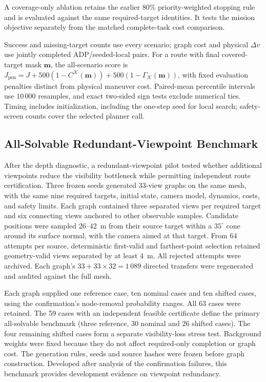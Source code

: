 \documentclass{IEEEtaes}
\newcommand{\unit}[2]{#1~#2}
\begin{document}
A coverage-only ablation retains the earlier 80\% priority-weighted stopping rule and is evaluated against the same required-target identities. It tests the mission objective separately from the matched complete-task cost comparison.

Success and missing-target counts use every scenario; graph cost and physical $\Delta v$ use jointly completed ADP/seeded-local pairs. For a route with final covered-target mask $\mathbf m$, the all-scenario score is $J_{\mathrm{pen}}=J+500(1-C^{\mathcal K}(\mathbf m))+500(1-\Gamma_{\mathcal K}(\mathbf m))$, with fixed evaluation penalties distinct from physical maneuver cost. Paired-mean percentile intervals use $10\,000$ resamples, and exact two-sided sign tests exclude numerical ties. Timing includes initialization, including the one-step seed for local search; safety-screen counts cover the selected planner call.

\subsection{All-Solvable Redundant-Viewpoint Benchmark}
\label{sec:redundant-view-protocol}

After the depth diagnostic, a redundant-viewpoint pilot tested whether additional viewpoints reduce the visibility bottleneck while permitting independent route certification. Three frozen seeds generated 33-view graphs on the same mesh, with the same nine required targets, initial state, camera model, dynamics, costs, and safety limits. Each graph contained three separated views per required target and six connecting views anchored to other observable samples. Candidate positions were sampled \unit{26--42}{m} from their source target within a $35^{\circ}$ cone around its surface normal, with the camera aimed at that target. From 64 attempts per source, deterministic first-valid and farthest-point selection retained geometry-valid views separated by at least \unit{4}{m}. All rejected attempts were archived. Each graph's $33+33\times32=1\,089$ directed transfers were regenerated and audited against the full mesh.

Each graph supplied one reference case, ten nominal cases and ten shifted cases, using the confirmation's node-removal probability ranges. All 63 cases were retained. The 59 cases with an independent feasible certificate define the primary all-solvable benchmark (three reference, 30 nominal and 26 shifted cases). The four remaining shifted cases form a separate visibility-loss stress test. Background weights were fixed because they do not affect required-only completion or graph cost. The generation rules, seeds and source hashes were frozen before graph construction. Developed after analysis of the confirmation failures, this benchmark provides development evidence on viewpoint redundancy.
\end{document}

